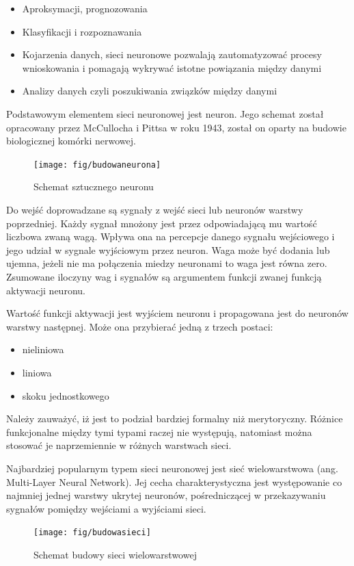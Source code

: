 \documentclass[brudnopis]{xmgr}
\begin{document}
\begin{itemize}
\item
Aproksymacji, prognozowania
\item
Klasyfikacji i rozpoznawania
\item
Kojarzenia danych, sieci neuronowe pozwalają zautomatyzować procesy wnioskowania i pomagają wykrywać istotne powiązania między danymi
\item
Analizy danych czyli poszukiwania związków między danymi
\end{itemize}

Podstawowym elementem sieci neuronowej jest neuron. Jego schemat został opracowany przez McCullocha i Pittsa w roku 1943, został on oparty na budowie biologicznej komórki nerwowej.

\begin{figure}[!tbh]
\centering
\texttt{[image: fig/budowaneurona]}
\caption{Schemat sztucznego neuronu}
\end{figure}

Do wejść doprowadzane są sygnały z wejść sieci lub neuronów warstwy poprzedniej. Każdy sygnał mnożony jest przez odpowiadającą mu wartość liczbowa zwaną wagą. Wpływa ona na percepcje danego sygnału wejściowego i jego udział w sygnale wyjściowym przez neuron. Waga może być dodania lub ujemna, jeżeli nie ma połączenia miedzy neuronami to waga jest równa zero. Zsumowane iloczyny wag i sygnałów są argumentem funkcji zwanej funkcją aktywacji neuronu.

Wartość funkcji aktywacji jest wyjściem neuronu i propagowana jest do neuronów warstwy następnej. Może ona przybierać jedną z trzech postaci:
\begin{itemize}
\item
nieliniowa
\item
liniowa
\item
skoku jednostkowego
\end{itemize}
\newpage

Należy zauważyć, iż jest to podział bardziej formalny niż merytoryczny. Różnice funkcjonalne między tymi typami raczej nie występują, natomiast można stosować je naprzemiennie w różnych warstwach sieci.

Najbardziej popularnym typem sieci neuronowej jest sieć wielowarstwowa (ang. Multi-Layer Neural Network). Jej cecha charakterystyczna jest występowanie co najmniej jednej warstwy ukrytej neuronów, pośredniczącej w przekazywaniu sygnałów pomiędzy wejściami a wyjściami sieci.

\begin{figure}[!tbh]
\centering
\texttt{[image: fig/budowasieci]}
\caption{Schemat budowy sieci wielowarstwowej}
\end{figure}
\end{document}
